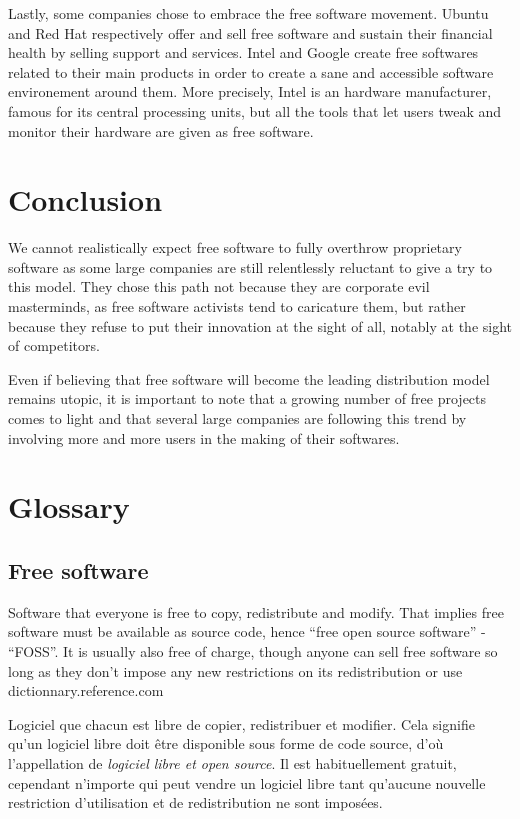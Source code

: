 \documentclass[12pt]{article}
\begin{document}
Lastly, some companies chose to embrace the free software
movement. Ubuntu and Red Hat respectively offer and sell free software
and sustain their financial health by selling support and
services. Intel and Google create free softwares related to their main
products in order to create a sane and accessible software
environement around them. More precisely, Intel is an hardware
manufacturer, famous for its central processing units, but all the
tools that let users tweak and monitor their hardware are given as
free software.

\section{Conclusion}

We cannot realistically expect free software to fully overthrow
proprietary software as some large companies are still relentlessly
reluctant to give a try to this model.  They chose this path not
because they are corporate evil masterminds, as free software
activists tend to caricature them, but rather because they refuse to
put their innovation at the sight of all, notably at the sight of
competitors.

Even if believing that free software will become the leading
distribution model remains utopic, it is important to note that a
growing number of free projects comes to light and that several large
companies are following this trend by involving more and more users in
the making of their softwares.

\section*{Glossary}

\subsection*{Free software}

{\color{bg}Software that everyone is free to copy, redistribute and
  modify. That implies free software must be available as source code,
  hence ``free open source software'' - ``FOSS''. It is usually also free
  of charge, though anyone can sell free software so long as they
  don't impose any new restrictions on its redistribution or use
  \textemdash $\;$ dictionnary.reference.com }

Logiciel que chacun est libre de copier, redistribuer et
modifier. Cela signifie qu'un logiciel libre doit être disponible sous
forme de code source, d'o\`u l'appellation de \textit{logiciel libre
  et open source}. Il est habituellement gratuit, cependant n'importe
qui peut vendre un logiciel libre tant qu'aucune nouvelle
restriction d'utilisation et de redistribution ne sont imposées.
\end{document}
